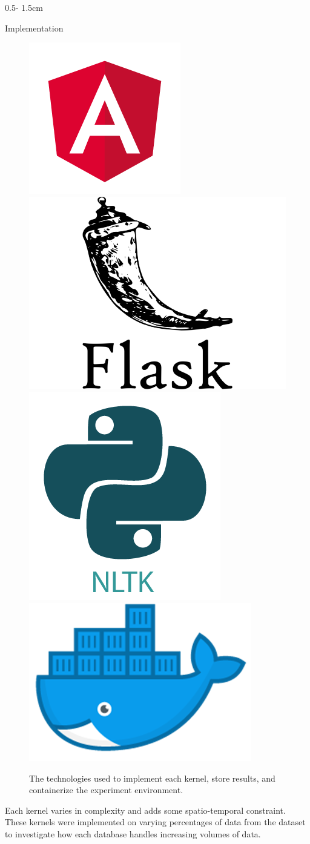 \documentclass{uioposter}
\begin{document}
\begin{frame}
\begin{columns}[onlytextwidth]
\begin{column}{0.5\textwidth - 1.5cm}
\begin{block}{Implementation}
\begin{figure}
            \includegraphics[width=.20\textwidth]{img/webapp/angular-logo.png}
            \hfill
            \includegraphics[width=.20\textwidth]{img/webapp/flask-logo.png}
            \hfill
            \includegraphics[width=.18\textwidth]{img/webapp/nltk-logo.png}
            \hfill
            \includegraphics[width=.20\textwidth]{img/webapp/docker-whale.png}
            
            \caption{The technologies used to implement each kernel, store results, and containerize the experiment environment.}
            \label{fig:webapp}
        \end{figure}
        
        Each kernel varies in complexity and adds some spatio-temporal constraint. These kernels were implemented on varying percentages of data from the dataset to investigate how each database handles increasing volumes of data.
        
        \medskip
        
    \end{block}
\end{column}



\end{columns}
\end{frame}
\end{document}
